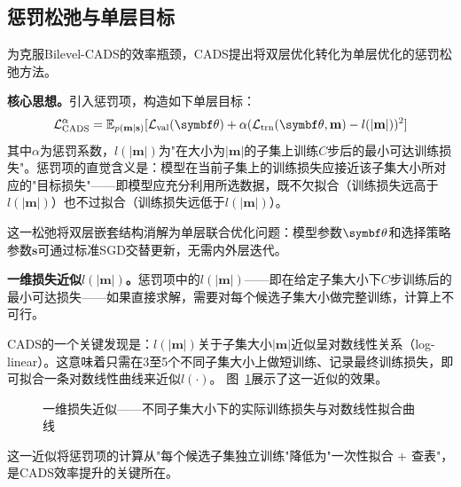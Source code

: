 \subsection{惩罚松弛与单层目标}

为克服Bilevel-CADS的效率瓶颈，CADS提出将双层优化转化为单层优化的惩罚松弛方法\cite{ye2022bome, kwon2023fully}。

\textbf{核心思想。}引入惩罚项，构造如下单层目标：
\begin{equation}\label{eq:cads-penalty}
  \mathcal{L}^{\alpha}_{\text{CADS}} = \mathbb{E}_{p(\mathbf{m}|\mathbf{s})}[\Lval(\btheta) + \alpha(\Ltrn(\btheta, \mathbf{m}) - l(|\mathbf{m}|))^2]
\end{equation}
其中$\alpha$为惩罚系数，$l(|\mathbf{m}|)$为"在大小为$|\mathbf{m}|$的子集上训练$C$步后的最小可达训练损失"。惩罚项的直觉含义是：模型在当前子集上的训练损失应接近该子集大小所对应的"目标损失"——即模型应充分利用所选数据，既不欠拟合（训练损失远高于$l(|\mathbf{m}|)$）也不过拟合（训练损失远低于$l(|\mathbf{m}|)$）。

这一松弛将双层嵌套结构消解为单层联合优化问题：模型参数$\btheta$和选择策略参数$\mathbf{s}$可通过标准SGD交替更新，无需内外层迭代。

\textbf{一维损失近似$l(|\mathbf{m}|)$。}惩罚项中的$l(|\mathbf{m}|)$——即在给定子集大小下$C$步训练后的最小可达损失——如果直接求解，需要对每个候选子集大小做完整训练，计算上不可行。

CADS的一个关键发现是：$l(|\mathbf{m}|)$关于子集大小$|\mathbf{m}|$近似呈对数线性关系（log-linear）。这意味着只需在3至5个不同子集大小上做短训练、记录最终训练损失，即可拟合一条对数线性曲线来近似$l(\cdot)$。%
图~\ref{fig:cads-loss-approx}展示了这一近似的效果。

\begin{figure}[htb]
  \centering
  \caption{一维损失近似——不同子集大小下的实际训练损失与对数线性拟合曲线}
  \label{fig:cads-loss-approx}
\end{figure}

这一近似将惩罚项的计算从"每个候选子集独立训练"降低为"一次性拟合 + 查表"，是CADS效率提升的关键所在。


